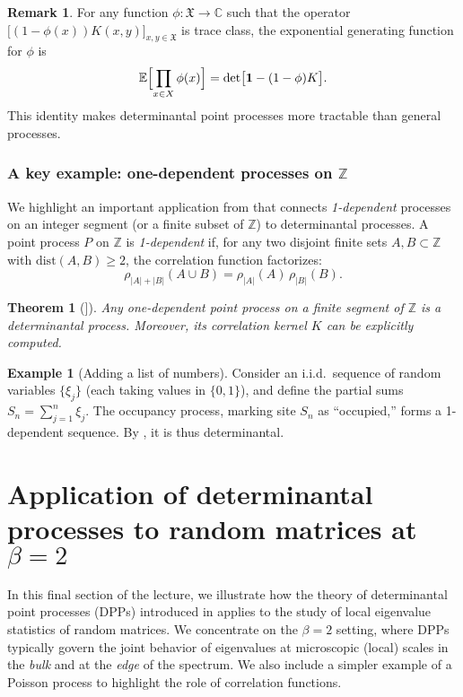 \documentclass[letterpaper,11pt,oneside,reqno]{article}
\numberwithin{equation}{section}
\newtheorem{theorem}[proposition]{Theorem}
\theoremstyle{definition}
\newtheorem{remark}[proposition]{Remark}
\newtheorem{example}[proposition]{Example}
\begin{document}
\begin{remark}
For any function \(\phi:\mathfrak{X}\to\mathbb{C}\) such that the operator
\(\bigl[(1-\phi(x))K(x,y)\bigr]_{x,y\in\mathfrak{X}}\) is trace class, the
exponential generating function for \(\phi\) is
\[
\mathbb{E}\Bigl[\prod_{x\in X}\phi(x)\Bigr] = \det\bigl[\mathbf{1} - (1-\phi)K\bigr].
\]
This identity makes determinantal point processes more tractable than general processes.
\end{remark}

\subsubsection*{A key example: one-dependent processes on \texorpdfstring{$\mathbb{Z}$}{}}
We highlight an important application from \cite{borodin2010adding} that connects
\emph{1-dependent} processes on an integer segment (or a finite subset of \(\mathbb{Z}\))
to determinantal processes. A point process \(P\) on \(\mathbb{Z}\) is \emph{1-dependent} if,
for any two disjoint finite sets \(A,B\subset\mathbb{Z}\) with \(\mathrm{dist}(A,B)\ge2\),
the correlation function factorizes:
\[
\rho_{|A|+|B|}(A\cup B) = \rho_{|A|}(A)\,\rho_{|B|}(B).
\]


\begin{theorem}[{\cite[Thm.~1.1]{borodin2010adding}]}]
\label{thm:1-dependent-implies-dpp}
Any one-dependent point process on a finite segment of \(\mathbb{Z}\) is a determinantal process.
Moreover, its correlation kernel \(K\) can be explicitly computed.
\end{theorem}

\begin{example}[Adding a list of numbers]
\label{ex:adding-numbers}
Consider an i.i.d.\ sequence of random variables \(\{\xi_j\}\) (each taking values in \(\{0,1\}\)),
and define the partial sums \(S_n = \sum_{j=1}^n \xi_j\). The occupancy process,
marking site \(S_n\) as “occupied,” forms a 1-dependent sequence. By ,
it is thus determinantal.
\end{example}

\section{Application of determinantal processes to random matrices at \texorpdfstring{$\beta=2$}{beta=2}}

In this final section of the lecture, we illustrate how the theory of determinantal point processes (DPPs)
introduced in 
applies to the study of local eigenvalue statistics of random matrices.
We concentrate on the \(\beta=2\) setting, where DPPs typically
govern the joint behavior of eigenvalues at microscopic (local)
scales in the \emph{bulk} and at the \emph{edge} of the spectrum.
We also include a simpler example of a Poisson process to highlight
the role of correlation functions.
\end{document}
